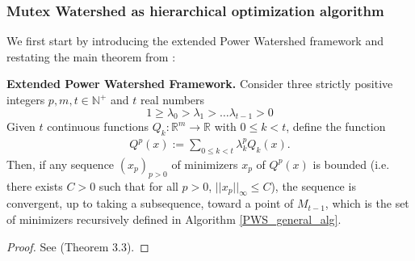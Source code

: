 \subsubsection{Mutex Watershed as hierarchical optimization algorithm}
We first start by introducing the extended Power Watershed framework and restating the main theorem from \cite{najman2017extending}: 
\begin{theorem} \label{theorem:PW_framework}
\textbf{\cite{najman2017extending} Extended Power Watershed Framework.}
Consider three strictly positive integers $p,m,t\in \mathbb{N}^+$ and $t$ real numbers 
\begin{equation}
    1 \geq \lambda_0 > \lambda_1 > \ldots \lambda_{t-1}>0 \label{eq:sorted lambda}
\end{equation}
Given $t$ continuous functions $Q_k: \mathbb{R}^m \rightarrow \mathbb{R}$ with $0\leq k < t$, define the function
\begin{align}
Q^p(x) := \sum_{0\leq k< t} \lambda^p_k Q_k (x). \label{eq:def_Q_p}
\end{align}
Then, if any sequence $(x_p)_{p>0}$ of minimizers $x_p$ of $Q^p(x)$ is bounded (i.e. there exists $C>0$ such that for all $p>0$, $||x_p||_{\infty}\leq C$), the sequence is convergent, up to taking a subsequence, toward a point of $M_{t-1}$, which is the set of minimizers recursively defined in Algorithm \ref{PWS_general_alg}.
\end{theorem}
\begin{proof}
See \cite{najman2017extending} (Theorem 3.3).
\end{proof}


